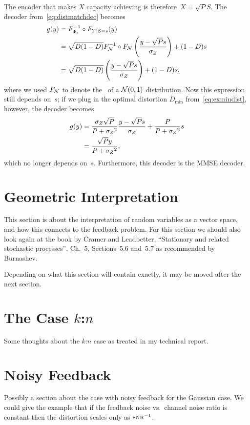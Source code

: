 The encoder that makes $X$ capacity achieving is therefore~$X = \sqrt{P}S$. The
decoder from~\eqref{eq:distmatchdec} becomes
\begin{align*}
  g(y) &= F_{\Phi_s}^{-1} \circ F_{Y|S=s}(y) \\
  &= \sqrt{D(1-D)} F_{\mathcal{N}}^{-1} \circ F_{\mathcal{N}}\left( \frac{y-\sqrt{P}s}{{\sigma_Z}}
  \right) + (1-D)s \\
  &= \sqrt{D(1-D)} \left( \frac{y-\sqrt{P}s}{{\sigma_Z}} \right) + (1-D)s,
\end{align*}
where we used $F_{\mathcal{N}}$ to denote the \cdf\ of a $\mathcal{N}(0,1)$ distribution. Now this
expression still depends on~$s$; if we plug in the optimal distortion $D_{\min}$
from~\eqref{eq:exmindist}, however, the decoder becomes
\begin{align*}
  g(y) &= \frac{{\sigma_Z} \sqrt{P}}{P+{{\sigma_Z}^2}} \frac{y - \sqrt{P}s}{{\sigma_Z}} + \frac{P}{P +
  {{\sigma_Z}^2}}s \\ 
  &= \frac{\sqrt{P}y}{P + {{\sigma_Z}^2}},
\end{align*}
which no longer depends on~$s$. Furthermore, this decoder is the MMSE decoder.




\section{Geometric Interpretation}

This section is about the interpretation of random variables as a vector space,
and how this connects to the feedback problem. For this section we should also
look again at the book by Cramer and Leadbetter, ``Stationary and related
stochastic processes'', Ch.~5, Sections~5.6 and~5.7 as recommended by Burnashev.

Depending on what this section will contain exactly, it may be moved after the
next section.


\section{The Case $k$:$n$}

Some thoughts about the $k$:$n$ case as treated in my technical report.


\section{Noisy Feedback}

Possibly a section about the case with noisy feedback for the Gaussian case. We
could give the example that if the feedback noise vs.\ channel noise ratio is
constant then the distortion scales only as $\snr^{-1}$.


